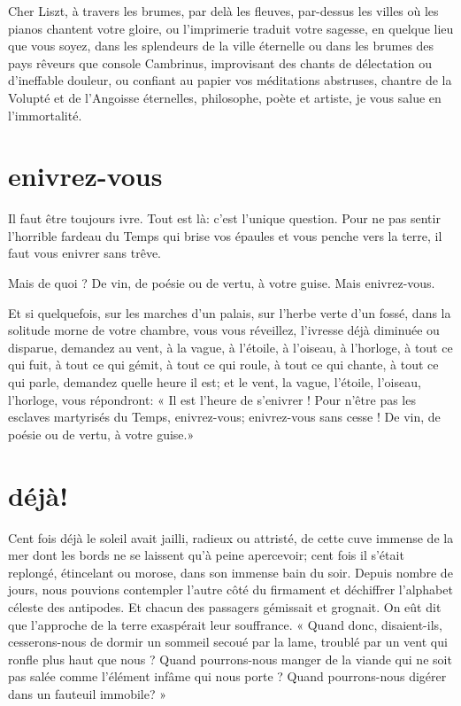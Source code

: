 Cher Liszt, à travers les brumes, par delà les fleuves, par{}-dessus les
villes où les pianos chantent votre gloire, ou
l’imprimerie traduit votre sagesse, en quelque lieu
que vous soyez, dans les splendeurs de la ville éternelle ou dans les
brumes des pays rêveurs que console Cambrinus, improvisant des chants
de délectation ou d’ineffable douleur, ou confiant au
papier vos méditations abstruses, chantre de la Volupté et de
l’Angoisse éternelles, philosophe, poète et artiste,
je vous salue en l’immortalité.

\quebra\section[Enivrez-vous]{enivrez-vous}

Il faut être toujours ivre. Tout est là: c’est
l’unique question. Pour ne pas sentir
l’horrible fardeau du Temps qui brise vos épaules et
vous penche vers la terre, il faut vous enivrer sans trêve.

Mais de quoi ? De vin, de poésie ou de vertu, à votre guise. Mais
enivrez{}-vous.

Et si quelquefois, sur les marches d’un palais, sur
l’herbe verte d’un fossé, dans la
solitude morne de votre chambre, vous vous réveillez,
l’ivresse déjà diminuée ou disparue, demandez au vent,
à la vague, à l’étoile, à l’oiseau, à
l’horloge, à tout ce qui fuit, à tout ce qui gémit, à
tout ce qui roule, à tout ce qui chante, à tout ce qui parle, demandez
quelle heure il est; et le vent, la vague, l’étoile,
l’oiseau, l’horloge, vous répondront:
« Il est l’heure de s’enivrer ! Pour
n’être pas les esclaves martyrisés du Temps,
enivrez{}-vous; enivrez{}-vous sans cesse ! De vin, de poésie ou de
vertu, à votre guise.»

\quebra\section[Déjà!]{déjà!}

Cent fois déjà le soleil avait jailli, radieux ou attristé, de cette
cuve immense de la mer dont les bords ne se laissent
qu’à peine apercevoir; cent fois il
s’était replongé, étincelant ou morose, dans son
immense bain du soir. Depuis nombre de jours, nous pouvions contempler
l’autre côté du firmament et déchiffrer
l’alphabet céleste des antipodes. Et chacun des
passagers gémissait et grognait. On eût dit que
l’approche de la terre exaspérait leur souffrance. «
Quand donc, disaient{}-ils, cesserons{}-nous de dormir un sommeil
secoué par la lame, troublé par un vent qui ronfle plus haut que nous ?
Quand pourrons{}-nous manger de la viande qui ne soit pas salée comme
l’élément infâme qui nous porte ? Quand
pourrons{}-nous digérer dans un fauteuil immobile? »

